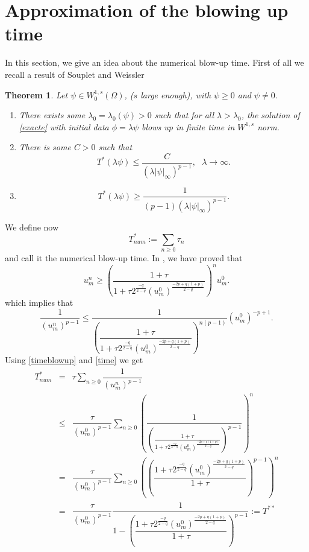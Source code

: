 \documentclass[a4paper,12pt,english,reqno]{smfart}
\newtheorem{th1}{Theorem}[section]
\begin{document}
	\section{Approximation of the blowing up time}
	In this section, we give an idea about the numerical blow-up time. First of all we recall a result of Souplet and Weissler \cite{soupletweissler}
	\begin{th1}
		Let $\psi \in W^{1,s}_{0}(\Omega)$, ($s$ large enough), with $\psi\geq 0$ and $\psi \neq 0.$
		\begin{enumerate}
			\item There exists some $\lambda_{0}=\lambda_{0}(\psi)>0$ such that for all $ \lambda>\lambda_{0}$, the solution of \eqref{exacte} with initial data $\phi=\lambda \psi$ blows up in finite time in $W^{1,s}$ norm.
			\item There is some $C>0$ such that 
			\begin{equation*}
			T^{*}(\lambda \psi)\leq \frac{C}{(\lambda \left| \psi \right|_{\infty})^{p-1}},\ \ \ \lambda\rightarrow \infty.
			\end{equation*}
			\item \begin{equation*}
			T^{*}(\lambda \psi)\geq \frac{1}{(p-1)(\lambda \left| \psi \right|_{\infty})^{p-1}}.
			\end{equation*}
		\end{enumerate}
	\end{th1}
	We define now 
	\begin{equation}
	T_{num}^{*}:=\sum_{n\geq 0}{\tau_{n}}
	\label{timeblowup}
	\end{equation}
	and call it the numerical blow-up time.
	In \cite{hani}, we have proved that 
	\begin{equation*}
	u_{m}^{n}\geq \left(\dfrac{1+\tau}{1+\tau 2^{\frac{-q}{2-q}}\left(u_{m}^{0}\right)^{\frac{-2p+q(1+p)}{2-q}}}\right)^{n}u_{m}^{0}.  
	\end{equation*}
	which implies that
	\begin{equation}
	\dfrac{1}{(u_{m}^{n})^{p-1}}\leq \dfrac{1}{\left(\dfrac{1+\tau}{1+\tau 2^{\frac{-q}{2-q}}(u_{m}^{0})^{\frac{-2p+q(1+p)}{2-q}}}\right)^{n(p-1)}}(u_{m}^{0})^{-p+1}.
	\label{time}
	\end{equation}
	Using \eqref{timeblowup} and \eqref{time} we get
	\begin{eqnarray}
	T_{num}^{*}&=&\tau \sum_{n\geq 0}\dfrac{1}{(u_{m}^{n})^{p-1}} \nonumber \\
	&\leq& \dfrac{\tau}{(u_{m}^{0})^{p-1}}\sum_{n\geq 0}\left(\dfrac{1}{\left(\frac{1+\tau}{1+\tau 2^{\frac{-q}{2-q}}\left(u_{m}^{0}\right)^{\frac{-2p+q(1+p)}{2-q}}}\right)^{p-1}}\right)^{n} \nonumber \\
	&=&\dfrac{\tau}{(u_{m}^{0})^{p-1}}\sum_{n\geq 0}\left(\left(\dfrac{1+\tau 2^{\frac{-q}{2-q}}\left(u_{m}^{0}\right)^{\frac{-2p+q(1+p)}{2-q}}}{1+\tau}\right)^{p-1}\right)^{n} \nonumber \\
	&=&\dfrac{\tau}{(u_{m}^{0})^{p-1}}\dfrac{1}{1-\left(\dfrac{1+\tau 2^{\frac{-q}{2-q}}\left(u_{m}^{0}\right)^{\frac{-2p+q(1+p)}{2-q}}}{1+\tau}\right)^{p-1}}:=T^{**}
	\label{tstar}
	\end{eqnarray}
\end{document}
